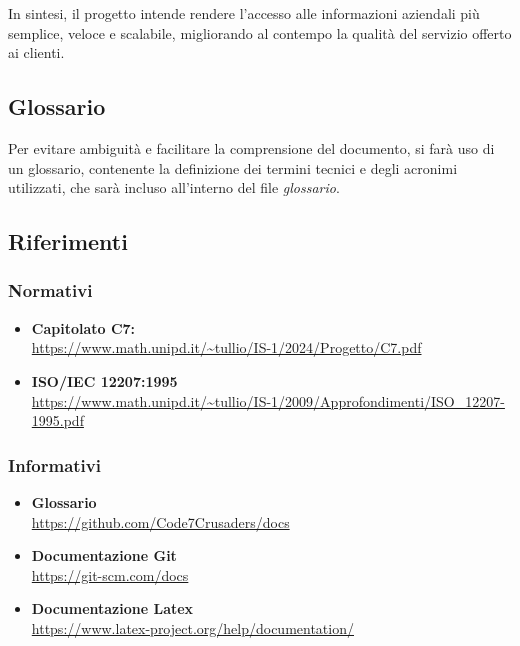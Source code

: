 In sintesi, il progetto intende rendere l'accesso alle informazioni aziendali più semplice, veloce e scalabile, 
migliorando al contempo la qualità del servizio offerto ai clienti.


\subsection{Glossario}
Per evitare ambiguità e facilitare la comprensione del documento, si farà uso di un glossario, 
contenente la definizione dei termini tecnici e degli acronimi utilizzati, 
che sarà incluso all'interno del file \textit{glossario}.


\subsection{Riferimenti}
\subsubsection{Normativi}
\begin{itemize}
	\item \textbf{Capitolato C7:} \\ \url{https://www.math.unipd.it/~tullio/IS-1/2024/Progetto/C7.pdf}
	\item \textbf{ISO/IEC 12207:1995} \\ \url{https://www.math.unipd.it/~tullio/IS-1/2009/Approfondimenti/ISO_12207-1995.pdf}
\end{itemize}

\subsubsection{Informativi}
\begin{itemize}
    \item\textbf{Glossario}\\ \url{https://github.com/Code7Crusaders/docs} %
    \item\textbf{Documentazione Git}\\ \url{https://git-scm.com/docs}
    \item\textbf{Documentazione Latex}\\ \url{https://www.latex-project.org/help/documentation/}

\end{itemize}